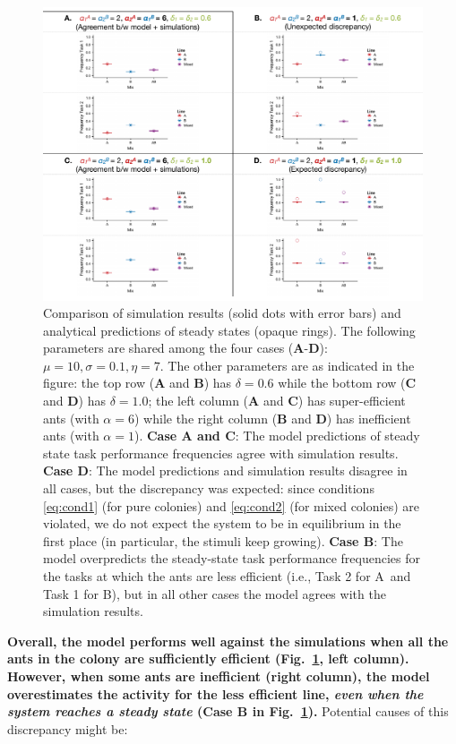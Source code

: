 \documentclass[10pt]{article}
\newcommand{\A}{{\color{red}A}}
\newcommand{\B}{{\color{blue}B}}
\begin{document}
\begin{figure}[H]
    \centering
    \includegraphics[trim={0 0.25in 0 0.2in}, clip, width=0.9\linewidth]{output/Task_dist/5050_comparison.pdf}
    \caption{Comparison of simulation results (solid dots with error bars) and analytical predictions of steady states (opaque rings). The following parameters are shared among the four cases (\textbf{A}-\textbf{D}): $\mu = 10, \sigma = 0.1, \eta = 7$. The other parameters are as indicated in the figure: the top row (\textbf{A} and \textbf{B}) has $\delta = 0.6$ while the bottom row (\textbf{C} and \textbf{D}) has $\delta = 1.0$; the left column (\textbf{A} and \textbf{C}) has super-efficient ants (with $\alpha = 6$) while the right column (\textbf{B} and \textbf{D}) has inefficient ants (with $\alpha = 1$). \textbf{Case A and C}: The model predictions of steady state task performance frequencies agree with simulation results. \textbf{Case D}: The model predictions and simulation results disagree in all cases, but the discrepancy was expected: since conditions \eqref{eq:cond1} (for pure colonies) and \eqref{eq:cond2} (for mixed colonies) are violated, we do not expect the system to be in equilibrium in the first place (in particular, the stimuli keep growing). \textbf{Case B}: The model overpredicts the steady-state task performance frequencies for the tasks at which the ants are less efficient (i.e., Task 2 for \A\ and Task 1 for \B), but in all other cases the model agrees with the simulation results.}
    \label{fig:5050_comp}
\end{figure}
\vspace{-5pt}
\textbf{Overall, the model performs well against the simulations when all the ants in the colony are sufficiently efficient (Fig.~\ref{fig:5050_comp}, left column). However, when some ants are inefficient (right column), the model overestimates the activity for the less efficient line, \textit{even when the system reaches a steady state} (\textbf{Case B} in Fig.~\ref{fig:5050_comp}).} Potential causes of this discrepancy might be:
\end{document}
